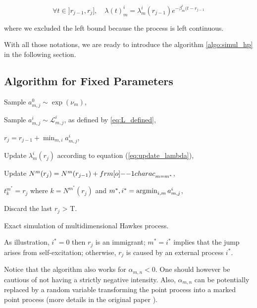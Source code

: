 \documentclass[11pt]{book}
\begin{document}
\begin{equation}
\label{eq:update_lambda_plot} 
\forall t \in ]r_{j-1}, r_j ], \quad \lambda (t)_m^i = \lambda_m^i ( r_{j-1} )  e^{ - \beta_m^i ( t - r_{j-1} }
\end{equation} 

where we excluded the left bound because the process is left continuous.
 
With all those notations, we are ready to introduce the algorithm \ref{algo:simul_hp} in the following section.









\subsection{Algorithm for Fixed Parameters}



\begin{algorithm}[H]
\label{algo:simul_hp}
\SetAlgoLined

			{ 
					{
						{Sample $a_{m,j}^0 \sim \exp( \nu_m ) $,
						
							{Sample $a_{m,j}^i \sim  \mathcal L^i_{m,j} $, as defined by \ref{eq:L_defined},
							}
						}
						
						$r_j = r_{j-1} + \min_{m,i} a_{m,j}^i$,
						
							{Update $\lambda_m^i ( r_j )$ according to equation (\ref{eq:update_lambda}),
							
							Update $N^m ( r_j ) = N^m( r_{j-1} ) + {\11charac}_{m = m^*} $,}
					$t_k^{m^*} = r_j$ where $k = N^{m^*} ( r_j ) $ and $ m^*,i^* = \operatorname*{\arg\!\min}_{i,m} a_{m,j}^i $,
					}
			Discard the last $r_j$ > T.
			}
\caption{Exact simulation of multidimensional Hawkes process.}
\end{algorithm}



\begin{remarque}
As illustration, $i^* = 0$ then $r_j$ is an immigrant; $m^* = i^*$ implies that the jump arises from self-excitation; otherwise, $r_j$ is caused by an external process $i^*$.
\end{remarque}

\begin{remarque}
Notice that the algorithm also works for $\alpha_{m,n} < 0$. One should however be cautious of not having a strictly negative intensity. Also, $\alpha_{m,n}$ can be potentially replaced by a random variable transforming the point process into a marked point process (more details in the original paper \cite{my_algo_simul}).
\end{remarque}
\end{document}
